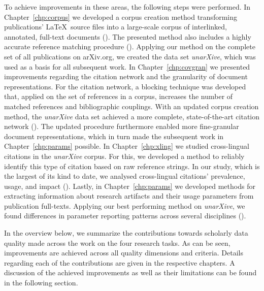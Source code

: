 To achieve improvements in these areas, the following steps were performed. In Chapter~\ref{chp:corpus} we developed a corpus creation method transforming publications' \LaTeX\ source files into a large-scale corpus of interlinked, annotated, full-text documents (). The presented method also includes a highly accurate reference matching procedure (). Applying our method on the complete set of all publications on arXiv.org, we created the data set \emph{unarXive}, which was used as a basis for all subsequent work. %
In Chapter~\ref{chp:covgran} we presented improvements regarding the citation network and the granularity of document representations. For the citation network, a blocking technique was developed that, applied on the set of references in a corpus, increases the number of matched references and bibliographic couplings. With an updated corpus creation method, the \emph{unarXive} data set achieved a more complete, state-of-the-art citation network (). The updated procedure furthermore enabled more fine-granular document representations, which in turn made the subsequent work in Chapter~\ref{chp:params} possible. %
In Chapter~\ref{chp:xling} we studied cross-lingual citations in the \emph{unarXive} corpus. For this, we developed a method to reliably identify this type of citation based on raw reference strings. In our study, which is the largest of its kind to date, we analysed cross-lingual citations' prevalence, usage, and impact (). %
Lastly, in Chapter~\ref{chp:params} we developed methods for extracting information about research artifacts and their usage parameters from publication full-texts. Applying our best performing method on \emph{unarXive}, we found differences in parameter reporting patterns across several disciplines (). %

In the overview below, we summarize the contributions towards scholarly data quality made across the work on the four research tasks. As can be seen, improvements are achieved across all quality dimensions and criteria. Details regarding each of the contributions are given in the respective chapters. A discussion of the achieved improvements as well as their limitations can be found in the following section.

